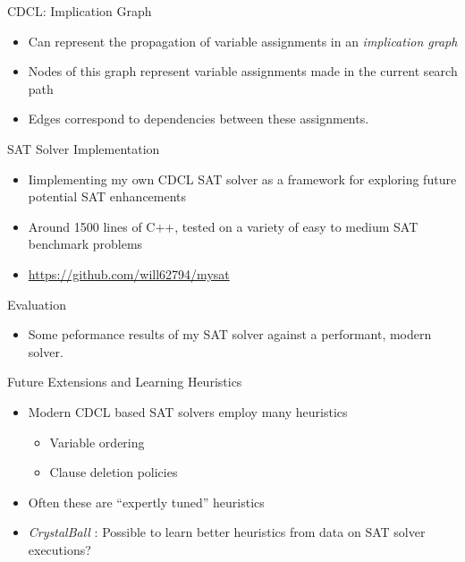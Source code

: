 \documentclass{beamer}
\begin{document}
\begin{frame}{CDCL: Implication Graph}
    \begin{itemize}
        \item Can represent the propagation of variable assignments in an \textit{implication graph}
        \item Nodes of this graph represent variable assignments made in the current search path
        \item Edges correspond to dependencies between these assignments.
\end{itemize}
\end{frame}


\begin{frame}{SAT Solver Implementation}
    \begin{itemize}
        \item Iimplementing my own CDCL SAT solver as a framework for exploring future potential SAT enhancements
        \item Around 1500 lines of C++, tested on a variety of easy to medium SAT benchmark problems
        \item \url{https://github.com/will62794/mysat}
    \end{itemize}
\end{frame}

\begin{frame}{Evaluation}
    \begin{itemize}
        \item Some peformance results of my SAT solver against a performant, modern solver.
    \end{itemize}
\end{frame}

\begin{frame}{Future Extensions and Learning Heuristics}
    \begin{itemize}
        \item Modern CDCL based SAT solvers employ many heuristics
            \begin{itemize}
                \item Variable ordering
                \item Clause deletion policies
            \end{itemize}
        \item Often these are ``expertly tuned'' heuristics
        \item \textit{CrystalBall} \cite{2019sooscrystalball}: Possible to learn better heuristics from data on SAT solver executions? 
    \end{itemize}
\end{frame}
\end{document}
